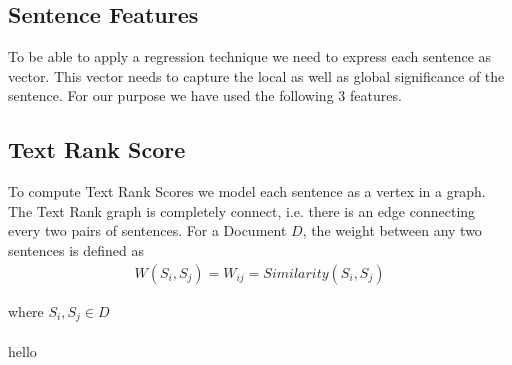 \documentclass[paper=a4, fontsize=11pt]{scrartcl} %
\numberwithin{equation}{section} %
\numberwithin{figure}{section} %
\numberwithin{table}{section} %
\begin{document}
\subsection{Sentence Features}
To be able to apply a regression technique we need to express each sentence as vector. This vector needs to capture the local as well as global significance of the sentence. For our purpose we have used the following 3 features.

\subsection{Text Rank Score}
To compute Text Rank Scores \cite{textrank} we model each sentence as a vertex in a graph. The Text Rank graph is completely connect, i.e. there is an edge connecting every two pairs of sentences. For a Document $D$, the weight between any two sentences is defined as 
\begin{align}
W( S_i,S_j) = W_{ij} = Similarity(S_i,S_j)
\end{align}

where $S_i,S_j \in D$ \\
\\
hello



\pagebreak
{}

\end{document}

